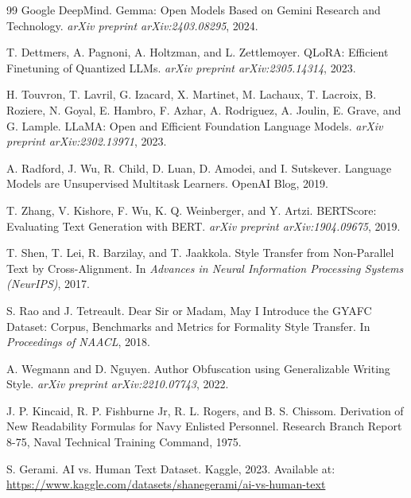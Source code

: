 \documentclass{article}
\begin{document}
\begin{thebibliography}{99}
Google DeepMind. Gemma: Open Models Based on Gemini Research and Technology. \textit{arXiv preprint arXiv:2403.08295}, 2024.

T. Dettmers, A. Pagnoni, A. Holtzman, and L. Zettlemoyer. QLoRA: Efficient Finetuning of Quantized LLMs. \textit{arXiv preprint arXiv:2305.14314}, 2023.

H. Touvron, T. Lavril, G. Izacard, X. Martinet, M. Lachaux, T. Lacroix, B. Roziere, N. Goyal, E. Hambro, F. Azhar, A. Rodriguez, A. Joulin, E. Grave, and G. Lample. LLaMA: Open and Efficient Foundation Language Models. \textit{arXiv preprint arXiv:2302.13971}, 2023.

A. Radford, J. Wu, R. Child, D. Luan, D. Amodei, and I. Sutskever. Language Models are Unsupervised Multitask Learners. OpenAI Blog, 2019.

T. Zhang, V. Kishore, F. Wu, K. Q. Weinberger, and Y. Artzi. BERTScore: Evaluating Text Generation with BERT. \textit{arXiv preprint arXiv:1904.09675}, 2019.

T. Shen, T. Lei, R. Barzilay, and T. Jaakkola. Style Transfer from Non-Parallel Text by Cross-Alignment. In \textit{Advances in Neural Information Processing Systems (NeurIPS)}, 2017.

S. Rao and J. Tetreault. Dear Sir or Madam, May I Introduce the GYAFC Dataset: Corpus, Benchmarks and Metrics for Formality Style Transfer. In \textit{Proceedings of NAACL}, 2018.

A. Wegmann and D. Nguyen. Author Obfuscation using Generalizable Writing Style. \textit{arXiv preprint arXiv:2210.07743}, 2022.

J. P. Kincaid, R. P. Fishburne Jr, R. L. Rogers, and B. S. Chissom. Derivation of New Readability Formulas for Navy Enlisted Personnel. Research Branch Report 8-75, Naval Technical Training Command, 1975.

S. Gerami. AI vs. Human Text Dataset. Kaggle, 2023. Available at: \url{https://www.kaggle.com/datasets/shanegerami/ai-vs-human-text}

\end{thebibliography}
\end{document}
